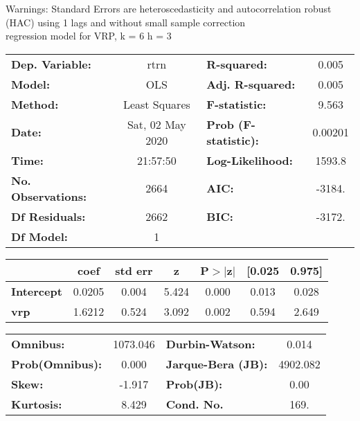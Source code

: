 Warnings: \newline
 [1] Standard Errors are heteroscedasticity and autocorrelation robust (HAC) using 1 lags and without small sample correction\\ 

regression model for VRP, k = 6 h = 3\begin{center}
\begin{tabular}{lclc}
\toprule
\textbf{Dep. Variable:}    &       rtrn       & \textbf{  R-squared:         } &     0.005   \\
\textbf{Model:}            &       OLS        & \textbf{  Adj. R-squared:    } &     0.005   \\
\textbf{Method:}           &  Least Squares   & \textbf{  F-statistic:       } &     9.563   \\
\textbf{Date:}             & Sat, 02 May 2020 & \textbf{  Prob (F-statistic):} &  0.00201    \\
\textbf{Time:}             &     21:57:50     & \textbf{  Log-Likelihood:    } &    1593.8   \\
\textbf{No. Observations:} &        2664      & \textbf{  AIC:               } &    -3184.   \\
\textbf{Df Residuals:}     &        2662      & \textbf{  BIC:               } &    -3172.   \\
\textbf{Df Model:}         &           1      & \textbf{                     } &             \\
\bottomrule
\end{tabular}
\begin{tabular}{lcccccc}
                   & \textbf{coef} & \textbf{std err} & \textbf{z} & \textbf{P$> |$z$|$} & \textbf{[0.025} & \textbf{0.975]}  \\
\midrule
\textbf{Intercept} &       0.0205  &        0.004     &     5.424  &         0.000        &        0.013    &        0.028     \\
\textbf{vrp}       &       1.6212  &        0.524     &     3.092  &         0.002        &        0.594    &        2.649     \\
\bottomrule
\end{tabular}
\begin{tabular}{lclc}
\textbf{Omnibus:}       & 1073.046 & \textbf{  Durbin-Watson:     } &    0.014  \\
\textbf{Prob(Omnibus):} &   0.000  & \textbf{  Jarque-Bera (JB):  } & 4902.082  \\
\textbf{Skew:}          &  -1.917  & \textbf{  Prob(JB):          } &     0.00  \\
\textbf{Kurtosis:}      &   8.429  & \textbf{  Cond. No.          } &     169.  \\
\bottomrule
\end{tabular}
\end{center}


